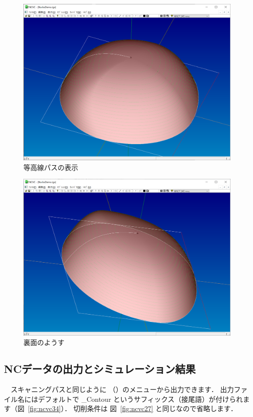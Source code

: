 \begin{figure}[H]
\centering
\includegraphics[scale=0.5]{No3/fig/fig32.png}
\caption{等高線パスの表示}
\label{fig:ncvc32}
\end{figure}

\begin{figure}[H]
\centering
\includegraphics[scale=0.5]{No3/fig/fig33.png}
\caption{裏面のようす}
\label{fig:ncvc33}
\end{figure}

\newpage
\subsection{NCデータの出力とシミュレーション結果}
　スキャニングパスと同じように （）のメニューから出力できます．
出力ファイル名にはデフォルトで \_Contour というサフィックス（接尾語）が付けられます（図~\ref{fig:ncvc34}）．
切削条件は 図~\ref{fig:ncvc27} と同じなので省略します．

